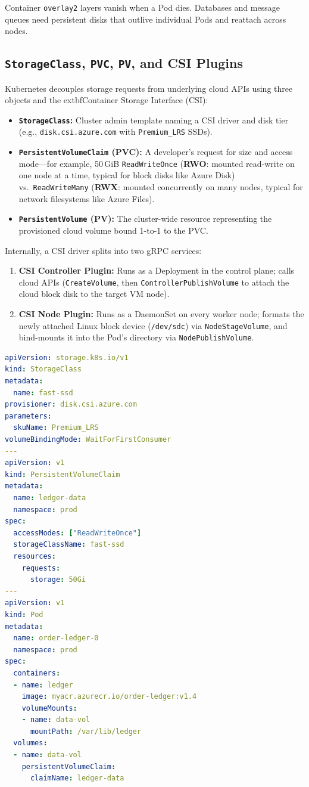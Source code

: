 Container \texttt{overlay2} layers vanish when a Pod dies. Databases and message queues need persistent disks that outlive individual Pods and reattach across nodes.

\subsection{\texttt{StorageClass}, \texttt{PVC}, \texttt{PV}, and CSI Plugins}
Kubernetes decouples storage requests from underlying cloud APIs using three objects and the 	extbf{Container Storage Interface (CSI)}:
\begin{itemize}[leftmargin=12pt]
  \item \textbf{\texttt{StorageClass}:} Cluster admin template naming a CSI driver and disk tier (e.g., \texttt{disk.csi.azure.com} with \texttt{Premium\_LRS} SSDs).
  \item \textbf{\texttt{PersistentVolumeClaim} (PVC):} A developer's request for size and access mode—for example, 50\,GiB \texttt{ReadWriteOnce} (\textbf{RWO}: mounted read-write on one node at a time, typical for block disks like Azure Disk) vs.\ \texttt{ReadWriteMany} (\textbf{RWX}: mounted concurrently on many nodes, typical for network filesystems like Azure Files).
  \item \textbf{\texttt{PersistentVolume} (PV):} The cluster-wide resource representing the provisioned cloud volume bound 1-to-1 to the PVC.
\end{itemize}

Internally, a CSI driver splits into two gRPC services:
\begin{enumerate}[leftmargin=15pt]
  \item \textbf{CSI Controller Plugin:} Runs as a Deployment in the control plane; calls cloud APIs (\texttt{CreateVolume}, then \texttt{ControllerPublishVolume} to attach the cloud block disk to the target VM node).
  \item \textbf{CSI Node Plugin:} Runs as a DaemonSet on every worker node; formats the newly attached Linux block device (\texttt{/dev/sdc}) via \texttt{NodeStageVolume}, and bind-mounts it into the Pod's directory via \texttt{NodePublishVolume}.
\end{enumerate}

\begin{lstlisting}[language=yaml, caption={Dynamic Persistent Storage with StorageClass, PVC, and Pod Mount}]
apiVersion: storage.k8s.io/v1
kind: StorageClass
metadata:
  name: fast-ssd
provisioner: disk.csi.azure.com
parameters:
  skuName: Premium_LRS
volumeBindingMode: WaitForFirstConsumer
---
apiVersion: v1
kind: PersistentVolumeClaim
metadata:
  name: ledger-data
  namespace: prod
spec:
  accessModes: ["ReadWriteOnce"]
  storageClassName: fast-ssd
  resources:
    requests:
      storage: 50Gi
---
apiVersion: v1
kind: Pod
metadata:
  name: order-ledger-0
  namespace: prod
spec:
  containers:
  - name: ledger
    image: myacr.azurecr.io/order-ledger:v1.4
    volumeMounts:
    - name: data-vol
      mountPath: /var/lib/ledger
  volumes:
  - name: data-vol
    persistentVolumeClaim:
      claimName: ledger-data
\end{lstlisting}


